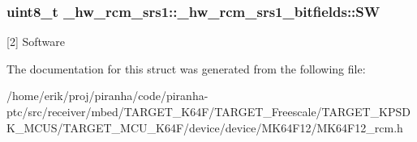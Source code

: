 \subsubsection[{\texorpdfstring{SW}{SW}}]{\setlength{\rightskip}{0pt plus 5cm}uint8\+\_\+t \+\_\+hw\+\_\+rcm\+\_\+srs1\+::\+\_\+hw\+\_\+rcm\+\_\+srs1\+\_\+bitfields\+::\+SW}\hypertarget{struct__hw__rcm__srs1_1_1__hw__rcm__srs1__bitfields_ac8ebd31fe8ce4a05372eb5c9d12124f3}{}\label{struct__hw__rcm__srs1_1_1__hw__rcm__srs1__bitfields_ac8ebd31fe8ce4a05372eb5c9d12124f3}
\mbox{[}2\mbox{]} Software 

The documentation for this struct was generated from the following file\+:\begin{DoxyCompactItemize}
\item 
/home/erik/proj/piranha/code/piranha-\/ptc/src/receiver/mbed/\+T\+A\+R\+G\+E\+T\+\_\+\+K64\+F/\+T\+A\+R\+G\+E\+T\+\_\+\+Freescale/\+T\+A\+R\+G\+E\+T\+\_\+\+K\+P\+S\+D\+K\+\_\+\+M\+C\+U\+S/\+T\+A\+R\+G\+E\+T\+\_\+\+M\+C\+U\+\_\+\+K64\+F/device/device/\+M\+K64\+F12/M\+K64\+F12\+\_\+rcm.\+h\end{DoxyCompactItemize}
